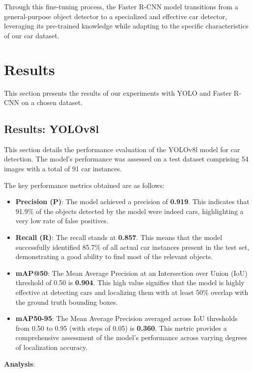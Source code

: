 \documentclass[12pt,a4paper]{article}
\begin{document}
Through this fine-tuning process, the Faster R-CNN model transitions from a general-purpose object detector to a specialized and effective car detector, leveraging its pre-trained knowledge while adapting to the specific characteristics of our car dataset.

\section{Results}
\label{sec:results}
This section presents the results of our experiments with YOLO and Faster R-CNN on a chosen dataset. 
\subsection{Results: YOLOv8l}
\label{ssec:results_yolo}

This section details the performance evaluation of the YOLOv8l model for car detection. The model's performance was assessed on a test dataset comprising 54 images with a total of 91 car instances.

The key performance metrics obtained are as follows:

\begin{itemize}
    \item \textbf{Precision (P)}: The model achieved a precision of \textbf{0.919}. This indicates that 91.9\% of the objects detected by the model were indeed cars, highlighting a very low rate of false positives.
    \item \textbf{Recall (R)}: The recall stands at \textbf{0.857}. This means that the model successfully identified 85.7\% of all actual car instances present in the test set, demonstrating a good ability to find most of the relevant objects.
    \item \textbf{mAP@50}: The Mean Average Precision at an Intersection over Union (IoU) threshold of 0.50 is \textbf{0.904}. This high value signifies that the model is highly effective at detecting cars and localizing them with at least 50\% overlap with the ground truth bounding boxes.
    \item \textbf{mAP50-95}: The Mean Average Precision averaged across IoU thresholds from 0.50 to 0.95 (with steps of 0.05) is \textbf{0.360}. This metric provides a comprehensive assessment of the model's performance across varying degrees of localization accuracy.
\end{itemize}

\textbf{Analysis}:
\end{document}
